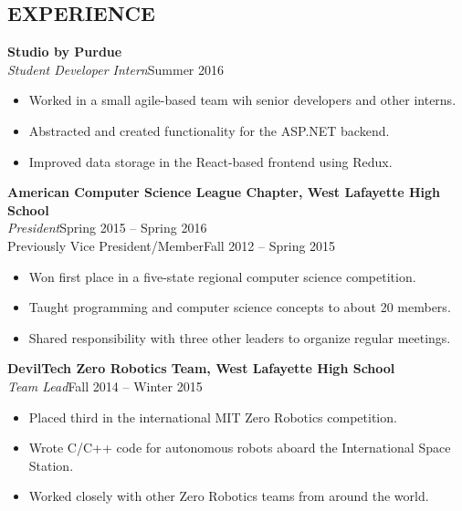 \documentclass[line,margin]{res}
\begin{document}
\begin{resume}
  \section{EXPERIENCE}
  {\bf\rmfamily Studio by Purdue}\\
  \emph{Student Developer Intern}\hfill Summer 2016
  \begin{itemize}  \itemsep -2pt %
  \item Worked in a small agile-based team wih senior developers and other interns.
  \item Abstracted and created functionality for the ASP.NET backend.
  \item Improved data storage in the React-based frontend using Redux.
  \end{itemize}


  {\bf\rmfamily American Computer Science League Chapter, West Lafayette High School}\\
  \emph{President}\hfill Spring 2015 -- Spring 2016\\
  Previously Vice President/Member\hfill Fall 2012 -- Spring 2015
  \begin{itemize}  \itemsep -2pt %
  \item Won first place in a five-state regional computer science competition.
  \item Taught programming and computer science concepts to about 20 members.
\item Shared responsibility with three other leaders to organize regular meetings.
  \end{itemize}

  {\bf\rmfamily DevilTech Zero Robotics Team, West Lafayette High School}\\
  \emph{Team Lead}\hfill Fall 2014 -- Winter 2015
  \begin{itemize}  \itemsep -2pt %
  \item Placed third in the international MIT Zero Robotics competition.
  \item Wrote C/C++ code for autonomous robots aboard the International Space Station.
  \item Worked closely with other Zero Robotics teams from around the world.
  \end{itemize}


\end{resume}
\end{document}
